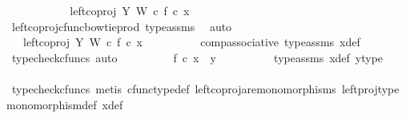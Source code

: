 \begin{isabellebody}
\ \ \ \ \ \ \isamarkupfalse%
\ \isamarkupfalse%
\ {\isachardoublequoteopen}{\isachardot}{\kern0pt}{\isachardot}{\kern0pt}{\isachardot}{\kern0pt}\ {\isacharequal}{\kern0pt}\ {\isacharparenleft}{\kern0pt}left{\isacharunderscore}{\kern0pt}coproj\ Y\ W\ {\isasymcirc}\isactrlsub c\ f{\isacharparenright}{\kern0pt}\ {\isasymcirc}\isactrlsub c\ x{\isachardoublequoteclose}\isanewline
\ \ \ \ \ \ \ \ \isamarkupfalse%
\ left{\isacharunderscore}{\kern0pt}coproj{\isacharunderscore}{\kern0pt}cfunc{\isacharunderscore}{\kern0pt}bowtie{\isacharunderscore}{\kern0pt}prod\ type{\isacharunderscore}{\kern0pt}assms\ \isamarkupfalse%
\ auto\isanewline
\ \ \ \ \ \ \isamarkupfalse%
\ \isamarkupfalse%
\ {\isachardoublequoteopen}{\isachardot}{\kern0pt}{\isachardot}{\kern0pt}{\isachardot}{\kern0pt}\ {\isacharequal}{\kern0pt}\ left{\isacharunderscore}{\kern0pt}coproj\ Y\ W\ {\isasymcirc}\isactrlsub c\ f\ {\isasymcirc}\isactrlsub c\ x{\isachardoublequoteclose}\isanewline
\ \ \ \ \ \ \ \ \isamarkupfalse%
\ comp{\isacharunderscore}{\kern0pt}associative{}\ type{\isacharunderscore}{\kern0pt}assms{\isacharparenleft}{\kern0pt}{}{\isacharparenright}{\kern0pt}\ x{\isacharunderscore}{\kern0pt}def\ \isamarkupfalse%
\ {\isacharparenleft}{\kern0pt}typecheck{\isacharunderscore}{\kern0pt}cfuncs{\isacharcomma}{\kern0pt}\ auto{\isacharparenright}{\kern0pt}\isanewline
\ \ \ \ \ \ \isamarkupfalse%
\ \isamarkupfalse%
\ {\isachardoublequoteopen}f\ {\isasymcirc}\isactrlsub c\ x\ {\isacharequal}{\kern0pt}\ y{\isachardoublequoteclose}\isanewline
\ \ \ \ \ \ \ \ \isamarkupfalse%
\ type{\isacharunderscore}{\kern0pt}assms{\isacharparenleft}{\kern0pt}{}{\isacharparenright}{\kern0pt}\ x{\isacharunderscore}{\kern0pt}def\ y{\isacharunderscore}{\kern0pt}type{}\ \ \isanewline
\ \ \ \ \ \ \ \ \isamarkupfalse%
\ {\isacharparenleft}{\kern0pt}typecheck{\isacharunderscore}{\kern0pt}cfuncs{\isacharcomma}{\kern0pt}\ metis\ cfunc{\isacharunderscore}{\kern0pt}type{\isacharunderscore}{\kern0pt}def\ left{\isacharunderscore}{\kern0pt}coproj{\isacharunderscore}{\kern0pt}are{\isacharunderscore}{\kern0pt}monomorphisms\ left{\isacharunderscore}{\kern0pt}proj{\isacharunderscore}{\kern0pt}type\ monomorphism{\isacharunderscore}{\kern0pt}def\ x{\isacharunderscore}{\kern0pt}def{\isacharparenright}{\kern0pt}\isanewline
\ \ \ \ \isamarkupfalse%
\isanewline
\ \ \ \ \isamarkupfalse%

\end{isabellebody}

